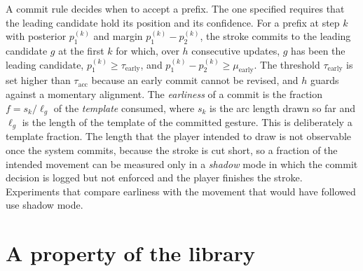 A commit rule decides when to accept a prefix. The one specified requires that the leading candidate hold its position and its confidence. For a prefix at step $k$ with posterior $p^{(k)}_1$ and margin $p^{(k)}_1-p^{(k)}_2$, the stroke commits to the leading candidate $g$ at the first $k$ for which, over $h$ consecutive updates, $g$ has been the leading candidate, $p^{(k)}_1\ge\tau_{\mathrm{early}}$, and $p^{(k)}_1-p^{(k)}_2\ge\mu_{\mathrm{early}}$. The threshold $\tau_{\mathrm{early}}$ is set higher than $\tau_{\mathrm{acc}}$ because an early commit cannot be revised, and $h$ guards against a momentary alignment. The \emph{earliness} of a commit is the fraction $f=s_k/\ell_g$ of the \emph{template} consumed, where $s_k$ is the arc length drawn so far and $\ell_g$ is the length of the template of the committed gesture. This is deliberately a template fraction. The length that the player intended to draw is not observable once the system commits, because the stroke is cut short, so a fraction of the intended movement can be measured only in a \emph{shadow} mode in which the commit decision is logged but not enforced and the player finishes the stroke. Experiments that compare earliness with the movement that would have followed use shadow mode.

\section{A property of the library}

